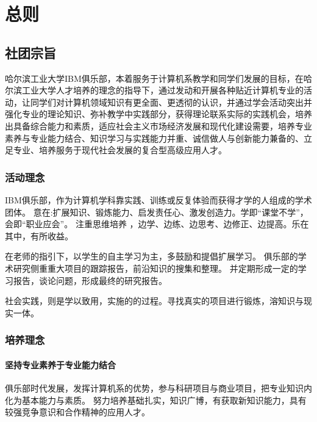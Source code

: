 \documentclass{club}
\begin{document}
\maketitle
\tableofcontents
\newpage

\section{总则}

\subsection{社团宗旨}

哈尔滨工业大学IBM俱乐部，本着服务于计算机系教学和同学们发展的目标，在哈尔滨工业大学人才培养的理念的指导下，通过发动和开展各种贴近计算机专业的活动，让同学们对计算机领域知识有更全面、更透彻的认识，并通过学会活动突出并强化专业的理论知识、弥补教学中实践部分，获得理论联系实际的实践机会，培养出具备综合能力和素质，适应社会主义市场经济发展和现代化建设需要，培养专业素养与专业能力结合、知识学习与实践能力并重、诚信做人与创新能力兼备的、立足专业、培养服务于现代社会发展的复合型高级应用人才。

\subsubsection{活动理念}

IBM俱乐部，作为计算机学科靠实践、训练或反复体验而获得才学的人组成的学术团体。
意在:扩展知识、锻炼能力、启发责任心、激发创造力。学即“课堂不学”，会即“职业应会”。
注重思维培养 ，边学、边练、边思考、边修正、边提高。乐在其中，有所收益。

在老师的指引下，以学生的自主学习为主，多鼓励和提倡扩展学习。
俱乐部的学术研究侧重重大项目的跟踪报告，前沿知识的搜集和整理。
并定期形成一定的学习报告，谈论问题，形成最终的研究报告。

社会实践，则是学以致用，实施的的过程。寻找真实的项目进行锻炼，溶知识与现实一体。

\subsubsection{培养理念}

\paragraph{坚持专业素养于专业能力结合}俱乐部时代发展，发挥计算机系的优势，参与科研项目与商业项目，把专业知识内化为基本能力与素质。
努力培养基础扎实，知识广博，有获取新知识能力，具有较强竞争意识和合作精神的应用人才。
\end{document}
